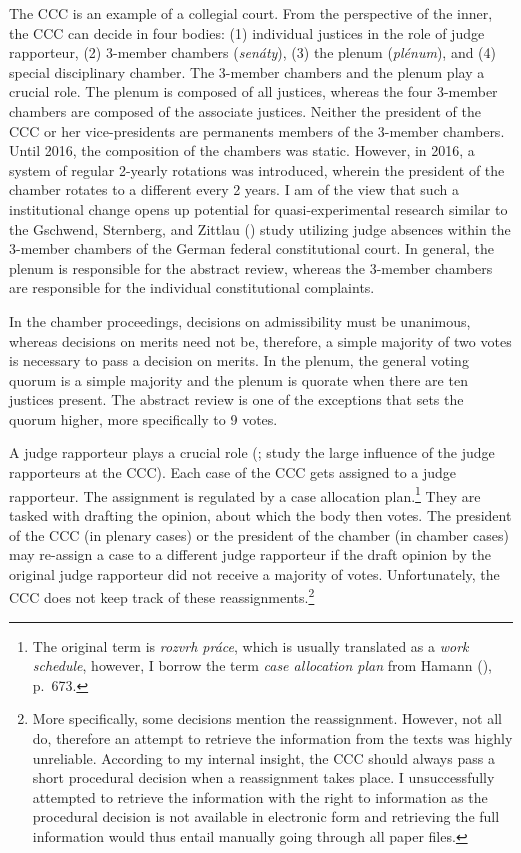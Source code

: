 \documentclass[
  11pt,
]{article}
\begin{document}
The CCC is an example of a collegial court. From the perspective of the inner, the CCC can decide in four bodies: (1) individual justices in the role of judge rapporteur, (2) 3-member chambers (\emph{senáty}), (3) the plenum (\emph{plénum}), and (4) special disciplinary chamber. The 3-member chambers and the plenum play a crucial role. The plenum is composed of all justices, whereas the four 3-member chambers are composed of the associate justices. Neither the president of the CCC or her vice-presidents are permanents members of the 3-member chambers. Until 2016, the composition of the chambers was static. However, in 2016, a system of regular 2-yearly rotations was introduced, wherein the president of the chamber rotates to a different every 2 years. I am of the view that such a institutional change opens up potential for quasi-experimental research similar to the Gschwend, Sternberg, and Zittlau () study utilizing judge absences within the 3-member chambers of the German federal constitutional court. In general, the plenum is responsible for the abstract review, whereas the 3-member chambers are responsible for the individual constitutional complaints.

In the chamber proceedings, decisions on admissibility must be unanimous, whereas decisions on merits need not be, therefore, a simple majority of two votes is necessary to pass a decision on merits. In the plenum, the general voting quorum is a simple majority and the plenum is quorate when there are ten justices present. The abstract review is one of the exceptions that sets the quorum higher, more specifically to 9 votes.

A judge rapporteur plays a crucial role (;  study the large influence of the judge rapporteurs at the CCC). Each case of the CCC gets assigned to a judge rapporteur. The assignment is regulated by a case allocation plan.\footnote{The original term is \emph{rozvrh práce}, which is usually translated as a \emph{work schedule}, however, I borrow the term \emph{case allocation plan} from Hamann (), p.~673.} They are tasked with drafting the opinion, about which the body then votes. The president of the CCC (in plenary cases) or the president of the chamber (in chamber cases) may re-assign a case to a different judge rapporteur if the draft opinion by the original judge rapporteur did not receive a majority of votes. Unfortunately, the CCC does not keep track of these reassignments.\footnote{More specifically, some decisions mention the reassignment. However, not all do, therefore an attempt to retrieve the information from the texts was highly unreliable. According to my internal insight, the CCC should always pass a short procedural decision when a reassignment takes place. I unsuccessfully attempted to retrieve the information with the right to information as the procedural decision is not available in electronic form and retrieving the full information would thus entail manually going through all paper files.}
\end{document}
